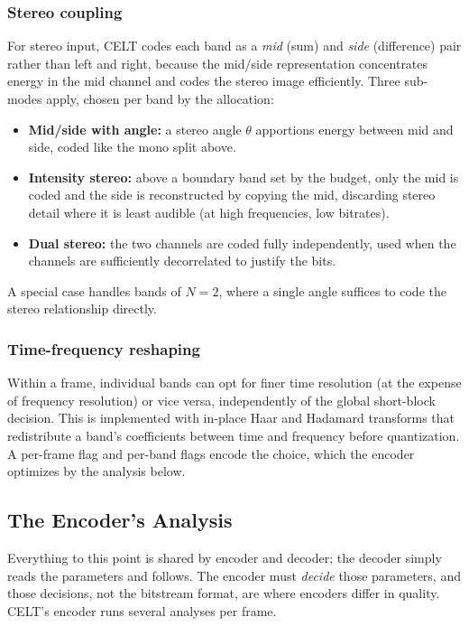 \subsubsection{Stereo coupling}

For stereo input, CELT codes each band as a \emph{mid} (sum) and \emph{side}
(difference) pair rather than left and right, because the mid/side
representation concentrates energy in the mid channel and codes the stereo image
efficiently. Three sub-modes apply, chosen per band by the allocation:
\begin{itemize}[itemsep=2pt]
  \item \textbf{Mid/side with angle:} a stereo angle $\theta$ apportions energy
    between mid and side, coded like the mono split above.
  \item \textbf{Intensity stereo:} above a boundary band set by the budget, only
    the mid is coded and the side is reconstructed by copying the mid, discarding
    stereo detail where it is least audible (at high frequencies, low bitrates).
  \item \textbf{Dual stereo:} the two channels are coded fully independently, used
    when the channels are sufficiently decorrelated to justify the bits.
\end{itemize}
A special case handles bands of $N=2$, where a single angle suffices to code the
stereo relationship directly.

\subsubsection{Time-frequency reshaping}

Within a frame, individual bands can opt for finer time resolution (at the
expense of frequency resolution) or vice versa, independently of the global
short-block decision. This is implemented with in-place Haar and Hadamard
transforms that redistribute a band's coefficients between time and frequency
before quantization. A per-frame  flag and per-band flags
encode the choice, which the encoder optimizes by the analysis below.

\subsection{The Encoder's Analysis}\label{subsec:celt_encoder}

Everything to this point is shared by encoder and decoder; the decoder simply
reads the parameters and follows. The encoder must \emph{decide} those
parameters, and those decisions, not the bitstream format, are where encoders
differ in quality. CELT's encoder runs several analyses per frame.

